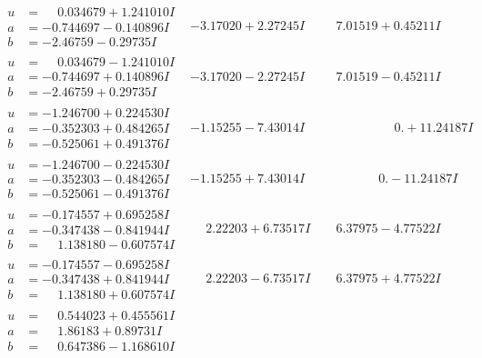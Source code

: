 \documentclass[1p]{elsarticle_modified}
\theoremstyle{definition}
\begin{document}
$$\begin{array}{c|c|c}
\begin{aligned}
u &= \phantom{-}0.034679 + 1.241010 I \\
a &= -0.744697 - 0.140896 I \\
b &= -2.46759 - 0.29735 I\end{aligned}
 & -3.17020 + 2.27245 I & \phantom{-}7.01519 + 0.45211 I \\ \hline\begin{aligned}
u &= \phantom{-}0.034679 - 1.241010 I \\
a &= -0.744697 + 0.140896 I \\
b &= -2.46759 + 0.29735 I\end{aligned}
 & -3.17020 - 2.27245 I & \phantom{-}7.01519 - 0.45211 I \\ \hline\begin{aligned}
u &= -1.246700 + 0.224530 I \\
a &= -0.352303 + 0.484265 I \\
b &= -0.525061 + 0.491376 I\end{aligned}
 & -1.15255 - 7.43014 I & \phantom{-0.000000 -}0. + 11.24187 I \\ \hline\begin{aligned}
u &= -1.246700 - 0.224530 I \\
a &= -0.352303 - 0.484265 I \\
b &= -0.525061 - 0.491376 I\end{aligned}
 & -1.15255 + 7.43014 I & \phantom{-0.000000 } 0. - 11.24187 I \\ \hline\begin{aligned}
u &= -0.174557 + 0.695258 I \\
a &= -0.347438 - 0.841944 I \\
b &= \phantom{-}1.138180 - 0.607574 I\end{aligned}
 & \phantom{-}2.22203 + 6.73517 I & \phantom{-}6.37975 - 4.77522 I \\ \hline\begin{aligned}
u &= -0.174557 - 0.695258 I \\
a &= -0.347438 + 0.841944 I \\
b &= \phantom{-}1.138180 + 0.607574 I\end{aligned}
 & \phantom{-}2.22203 - 6.73517 I & \phantom{-}6.37975 + 4.77522 I \\ \hline\begin{aligned}
u &= \phantom{-}0.544023 + 0.455561 I \\
a &= \phantom{-}1.86183 + 0.89731 I \\
b &= \phantom{-}0.647386 - 1.168610 I\end{aligned}

\end{array}$$
\end{document}
